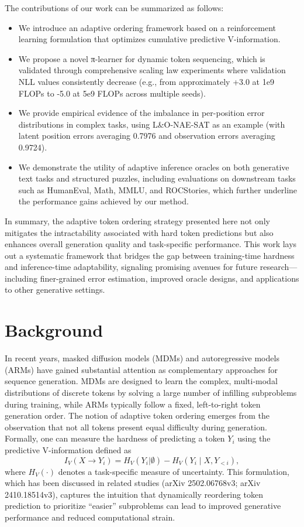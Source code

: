 \documentclass{article}
\begin{document}
The contributions of our work can be summarized as follows:
\begin{itemize}
    \item We introduce an adaptive ordering framework based on a reinforcement learning formulation that optimizes cumulative predictive V-information.
    \item We propose a novel π-learner for dynamic token sequencing, which is validated through comprehensive scaling law experiments where validation NLL values consistently decrease (e.g., from approximately +3.0 at 1e9 FLOPs to -5.0 at 5e9 FLOPs across multiple seeds).
    \item We provide empirical evidence of the imbalance in per-position error distributions in complex tasks, using L\&O-NAE-SAT as an example (with latent position errors averaging 0.7976 and observation errors averaging 0.9724).
    \item We demonstrate the utility of adaptive inference oracles on both generative text tasks and structured puzzles, including evaluations on downstream tasks such as HumanEval, Math, MMLU, and ROCStories, which further underline the performance gains achieved by our method.
\end{itemize}

In summary, the adaptive token ordering strategy presented here not only mitigates the intractability associated with hard token predictions but also enhances overall generation quality and task-specific performance. This work lays out a systematic framework that bridges the gap between training-time hardness and inference-time adaptability, signaling promising avenues for future research—including finer-grained error estimation, improved oracle designs, and applications to other generative settings.

\section{Background}
In recent years, masked diffusion models (MDMs) and autoregressive models (ARMs) have gained substantial attention as complementary approaches for sequence generation. MDMs are designed to learn the complex, multi-modal distributions of discrete tokens by solving a large number of infilling subproblems during training, while ARMs typically follow a fixed, left-to-right token generation order. The notion of adaptive token ordering emerges from the observation that not all tokens present equal difficulty during generation. Formally, one can measure the hardness of predicting a token \( Y_i \) using the predictive V-information defined as 
\[
I_V(X \to Y_i) = H_V(Y_i|\emptyset) - H_V(Y_i \mid X, Y_{<i}),
\]
where \( H_V(\cdot) \) denotes a task-specific measure of uncertainty. This formulation, which has been discussed in related studies (arXiv 2502.06768v3; arXiv 2410.18514v3), captures the intuition that dynamically reordering token prediction to prioritize “easier” subproblems can lead to improved generative performance and reduced computational strain.
\end{document}
